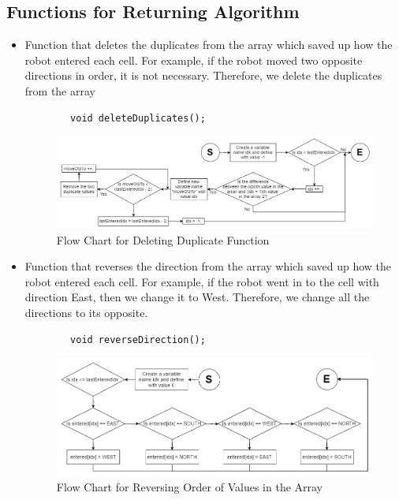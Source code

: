 \documentclass[11pt]{article}
\begin{document}

\subsection{Functions for Returning Algorithm}
\begin{itemize}
\item Function that deletes the duplicates from the array which saved up how the robot entered each cell. For example, if the robot moved two opposite directions in order, it is not necessary. Therefore, we delete the duplicates from the array
 	\begin{verbatim}
		void deleteDuplicates();
	\end{verbatim}
\begin{figure}[htp]
\centering
\includegraphics[scale=0.50]{images/Software_Flowchart/deleteDuplicate.png}
\caption{Flow Chart for Deleting Duplicate Function}
\label{}
\end{figure}
\item Function that reverses the direction from the array which saved up how the robot entered each cell. For example, if the robot went in to the cell with direction East, then we change it to West. Therefore, we change all the directions to its opposite.
 	\begin{verbatim}
		void reverseDirection();
	\end{verbatim}
\begin{figure}[htp]
\centering
\includegraphics[scale=0.50]{images/Software_Flowchart/reverseDirection.png}
\caption{Flow Chart for Reversing Order of Values in the Array}
\label{}
\end{figure}

\end{itemize}
\end{document}
